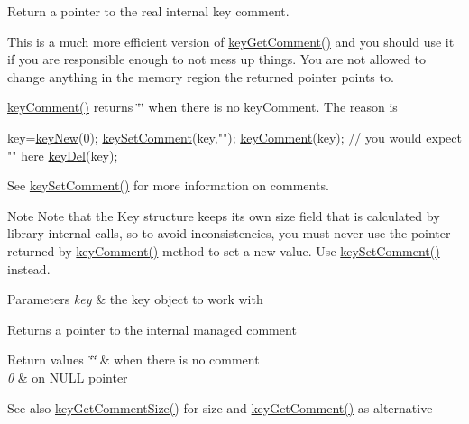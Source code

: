 Return a pointer to the real internal {\ttfamily key} comment. 

This is a much more efficient version of \hyperlink{group__meta_gafb89735689929ff717cc9f2d0d0b46a2}{key\+Get\+Comment()} and you should use it if you are responsible enough to not mess up things. You are not allowed to change anything in the memory region the returned pointer points to.

\hyperlink{group__meta_gac89fd319783b3457db45b4c09e55274a}{key\+Comment()} returns \char`\"{}\char`\"{} when there is no key\+Comment. The reason is 
\begin{DoxyCode}
key=\hyperlink{group__key_gad23c65b44bf48d773759e1f9a4d43b89}{keyNew}(0);
\hyperlink{group__meta_ga8863a877a84fa46e6017fe72e49b89c1}{keySetComment}(key,\textcolor{stringliteral}{""});
\hyperlink{group__meta_gac89fd319783b3457db45b4c09e55274a}{keyComment}(key); \textcolor{comment}{// you would expect "" here}
\hyperlink{group__key_ga3df95bbc2494e3e6703ece5639be5bb1}{keyDel}(key);
\end{DoxyCode}


See \hyperlink{group__meta_ga8863a877a84fa46e6017fe72e49b89c1}{key\+Set\+Comment()} for more information on comments.

\begin{DoxyNote}{Note}
Note that the Key structure keeps its own size field that is calculated by library internal calls, so to avoid inconsistencies, you must never use the pointer returned by \hyperlink{group__meta_gac89fd319783b3457db45b4c09e55274a}{key\+Comment()} method to set a new value. Use \hyperlink{group__meta_ga8863a877a84fa46e6017fe72e49b89c1}{key\+Set\+Comment()} instead.
\end{DoxyNote}

\begin{DoxyParams}{Parameters}
{\em key} & the key object to work with \\
\hline
\end{DoxyParams}
\begin{DoxyReturn}{Returns}
a pointer to the internal managed comment 
\end{DoxyReturn}

\begin{DoxyRetVals}{Return values}
{\em \char`\"{}\char`\"{}} & when there is no comment \\
\hline
{\em 0} & on N\+U\+LL pointer \\
\hline
\end{DoxyRetVals}
\begin{DoxySeeAlso}{See also}
\hyperlink{group__meta_ga0dd737fadc16d4cf16720d17f066a9d3}{key\+Get\+Comment\+Size()} for size and \hyperlink{group__meta_gafb89735689929ff717cc9f2d0d0b46a2}{key\+Get\+Comment()} as alternative 
\end{DoxySeeAlso}
\mbox{\label{group__meta_gafb89735689929ff717cc9f2d0d0b46a2}} 
